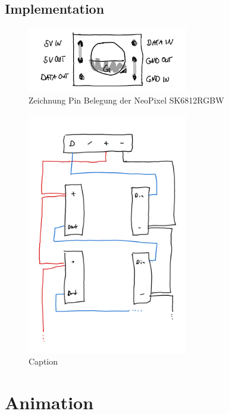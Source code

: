     \subsection{Implementation}

        \begin{figure}[h]
            \begin{center}
                \includegraphics[width=7cm]{sketches/leds_2.png}
            \end{center}
            \caption{Zeichnung Pin Belegung der NeoPixel SK6812RGBW}
            \label{fig:leds_2}
        \end{figure}
    
        \begin{figure}[h]
            \begin{center}
                \includegraphics[width=7cm]{sketches/leds_1.png}
            \end{center}
            \caption{Caption}
            \label{fig:leds_1}
        \end{figure}



\section{Animation}
